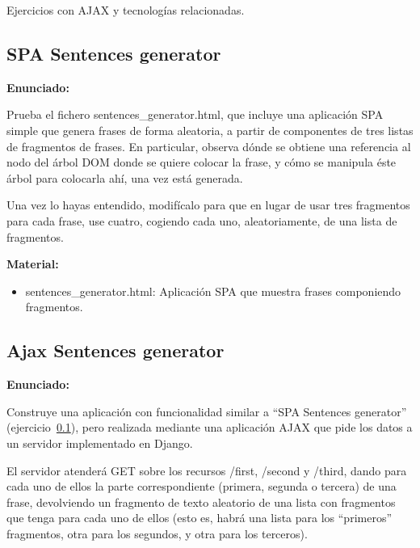 Ejercicios con AJAX y tecnologías relacionadas.

\subsection{SPA Sentences generator}
\label{subsec:spa-sentences-generator}

\textbf{Enunciado:}

Prueba el fichero sentences\_generator.html, que incluye una aplicación SPA simple que genera frases de forma aleatoria, a partir de componentes de tres listas de fragmentos de frases. En particular, observa dónde se obtiene una referencia al nodo del árbol DOM donde se quiere colocar la frase, y cómo se manipula éste árbol para colocarla ahí, una vez está generada.

Una vez lo hayas entendido, modifícalo para que en lugar de usar tres fragmentos para cada frase, use cuatro, cogiendo cada uno, aleatoriamente, de una lista de fragmentos.

\textbf{Material:}
\begin{itemize}
\item sentences\_generator.html: Aplicación SPA que muestra frases componiendo fragmentos.
\end{itemize}

\subsection{Ajax Sentences generator}
\label{subsec:ajax-sentences-generator}

\textbf{Enunciado:}

Construye una aplicación con funcionalidad similar a ``SPA Sentences generator'' (ejercicio~\ref{subsec:spa-sentences-generator}), pero realizada mediante una aplicación AJAX que pide los datos a un servidor implementado en Django.

El servidor atenderá GET sobre los recursos /first, /second y /third, dando para cada uno de ellos la parte correspondiente (primera, segunda o tercera) de una frase, devolviendo un fragmento de texto aleatorio de una lista con fragmentos que tenga para cada uno de ellos (esto es, habrá una lista para los ``primeros'' fragmentos, otra para los segundos, y otra para los terceros).


